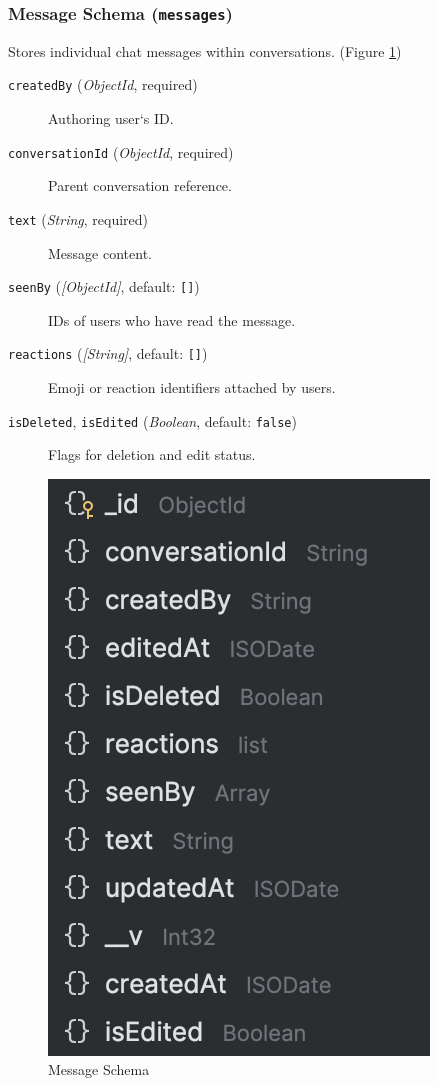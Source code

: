 \subsubsection{Message Schema (\texttt{messages})}
Stores individual chat messages within conversations. (Figure \ref{fig:message-schema})
\begin{description}
  \item[\texttt{createdBy} (\emph{ObjectId}, required)]  
    Authoring user`s ID.
  \item[\texttt{conversationId} (\emph{ObjectId}, required)]  
    Parent conversation reference.
  \item[\texttt{text} (\emph{String}, required)]  
    Message content.
  \item[\texttt{seenBy} (\emph{[ObjectId]}, default: \texttt{[]})]  
    IDs of users who have read the message.
  \item[\texttt{reactions} (\emph{[String]}, default: \texttt{[]})]  
    Emoji or reaction identifiers attached by users.
  \item[\texttt{isDeleted}, \texttt{isEdited} (\emph{Boolean}, default: \texttt{false})]  
    Flags for deletion and edit status.
\end{description}

\begin{figure}[H]
  \centering
  \includegraphics{message-schema.png}
  \caption{Message Schema}
  \label{fig:message-schema}
\end{figure}

